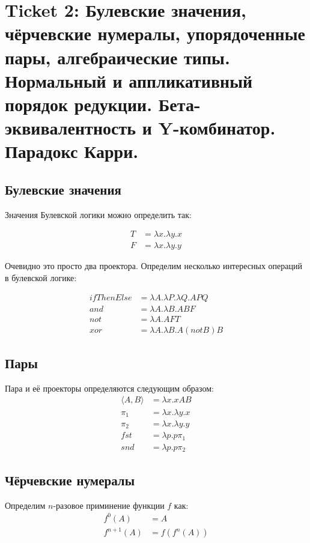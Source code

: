 \section{Ticket 2: Булевские значения, чёрчевские нумералы, упорядоченные пары,
  алгебраические типы. Нормальный и аппликативный порядок редукции.
  Бета-эквивалентность и Y-комбинатор. Парадокс Карри.}
\label{sec-3}
\subsection{Булевские значения}
\label{sec-3-1}
Значения Булевской логики можно определить так:

\begin{align*}
T &= \lambda x . \lambda y . x \\
F &= \lambda x . \lambda y . y
\end{align*}

Очевидно это просто два проектора. Определим несколько интересных операций в
булевской логике:

\begin{align*}
ifThenElse &= \lambda A . \lambda P . \lambda Q . A P Q \\
and &= \lambda A . \lambda B . A B F \\
not &= \lambda A . A F T \\
xor &= \lambda A . \lambda B . A (not B) B
\end{align*}

\subsection{Пары}
\label{sec-3-2}
Пара и её проекторы определяются следующим образом:
\begin{align*}
\langle A, B \rangle &= \lambda x . x A B \\
\pi_1 &= \lambda x . \lambda y . x \\
\pi_2 &= \lambda x . \lambda y . y \\
fst &= \lambda p . p \pi_1 \\
snd &= \lambda p . p \pi_2
\end{align*}

\subsection{Чёрчевские нумералы}
\label{sec-3-3}

Определим $n$-разовое приминение функции $f$ как:
\begin{align*}
f^0(A) &= A \\
f^{n+1}(A) &= f(f^n(A))
\end{align*}

